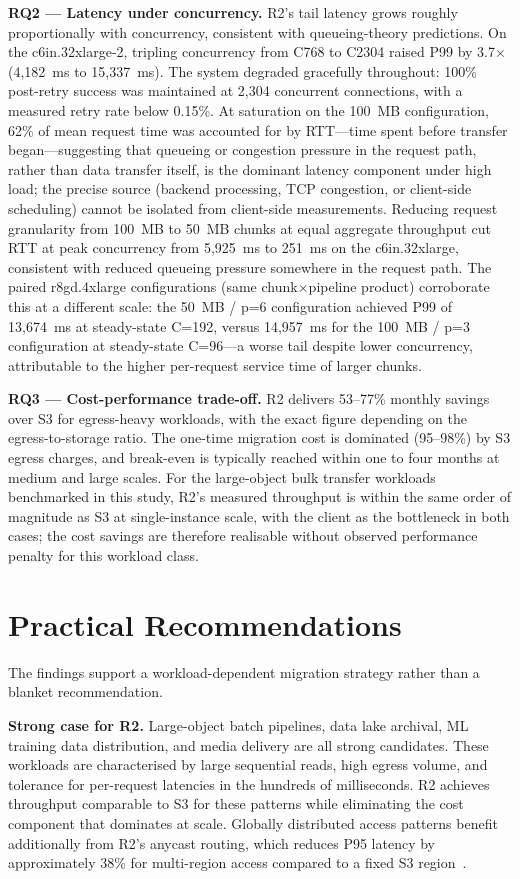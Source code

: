 \textbf{RQ2 --- Latency under concurrency.} R2's tail latency grows roughly proportionally with concurrency, consistent with queueing-theory predictions. On the c6in.32xlarge-2, tripling concurrency from C768 to C2304 raised P99 by 3.7$\times$ (4,182~ms to 15,337~ms). The system degraded gracefully throughout: 100\% post-retry success was maintained at 2,304 concurrent connections, with a measured retry rate below 0.15\%. At saturation on the 100~MB configuration, 62\% of mean request time was accounted for by RTT---time spent before transfer began---suggesting that queueing or congestion pressure in the request path, rather than data transfer itself, is the dominant latency component under high load; the precise source (backend processing, TCP congestion, or client-side scheduling) cannot be isolated from client-side measurements. Reducing request granularity from 100~MB to 50~MB chunks at equal aggregate throughput cut RTT at peak concurrency from 5,925~ms to 251~ms on the c6in.32xlarge, consistent with reduced queueing pressure somewhere in the request path. The paired r8gd.4xlarge configurations (same chunk$\times$pipeline product) corroborate this at a different scale: the 50~MB / p=6 configuration achieved P99 of 13,674~ms at steady-state C=192, versus 14,957~ms for the 100~MB / p=3 configuration at steady-state C=96---a worse tail despite lower concurrency, attributable to the higher per-request service time of larger chunks.

\textbf{RQ3 --- Cost-performance trade-off.} R2 delivers 53--77\% monthly savings over S3 for egress-heavy workloads, with the exact figure depending on the egress-to-storage ratio. The one-time migration cost is dominated (95--98\%) by S3 egress charges, and break-even is typically reached within one to four months at medium and large scales. For the large-object bulk transfer workloads benchmarked in this study, R2's measured throughput is within the same order of magnitude as S3 at single-instance scale, with the client as the bottleneck in both cases; the cost savings are therefore realisable without observed performance penalty for this workload class.

\section{Practical Recommendations}

The findings support a workload-dependent migration strategy rather than a blanket recommendation.

\textbf{Strong case for R2.} Large-object batch pipelines, data lake archival, ML training data distribution, and media delivery are all strong candidates. These workloads are characterised by large sequential reads, high egress volume, and tolerance for per-request latencies in the hundreds of milliseconds. R2 achieves throughput comparable to S3 for these patterns while eliminating the cost component that dominates at scale. Globally distributed access patterns benefit additionally from R2's anycast routing, which reduces P95 latency by approximately 38\% for multi-region access compared to a fixed S3 region~\cite{cloudflare-r2-faster-s3}.

